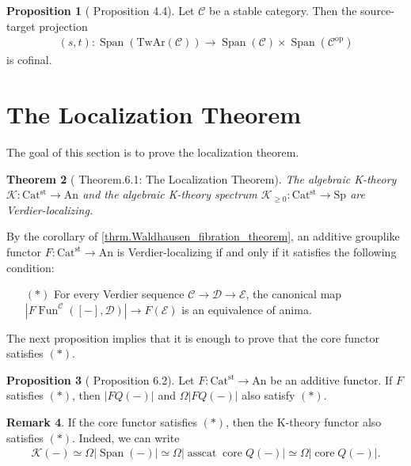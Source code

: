 \documentclass[a4paper,dvipdfmx,11pt,reqno]{amsart}
\DeclareMathOperator{\myop}{op}
\DeclareMathOperator{\Fun}{Fun}
\newcommand{\C}{\mathcal{C}}
\newcommand{\D}{\mathcal{D}}
\newcommand{\E}{\mathcal{E}}
\newcommand{\K}{\mathcal{K}}
\DeclareMathOperator{\core}{core}
\DeclareMathOperator{\asscat}{asscat}
\DeclareMathOperator{\Span}{Span}
\newcommand{\An}{\mathrm{An}}
\newcommand{\Catst}{\mathrm{Cat^{st}}}
\newcommand{\TwAr}{\mathrm{TwAr}}
\newcommand{\Sp}{\mathrm{Sp}}
\newtheorem{theorem}{Theorem}[section]
\theoremstyle{definition}
\newtheorem{proposition}[theorem]{Proposition}
\newtheorem{remark}[theorem]{Remark}
\begin{document}
\begin{proposition}[\cite{HLS23} Proposition 4.4] \label{HLS23.prop.4.4}
  Let $\C$ be a stable category.
  Then the source-target projection 
  \begin{align*}
    (s,t) : \Span(\TwAr(\C)) \to \Span(\C) \times \Span(\C^{\myop})
  \end{align*}
  is cofinal.
\end{proposition}


\section{The Localization Theorem}

The goal of this section is to prove the localization theorem.

\begin{theorem}[\cite{HLS23} Theorem.6.1: The Localization Theorem] \label{thrm.localization_theorem}
  The algebraic K-theory $\K : \Catst \to \An$ and the algebraic K-theory spectrum $\K_{\geq 0} : \Catst \to \Sp$ are Verdier-localizing.
\end{theorem}

By the corollary of \cref{thrm.Waldhausen_fibration_theorem}, an additive grouplike functor $F : \Catst \to \An$ is Verdier-localizing if and only if it satisfies the following condition:
\begin{itemize}
  \item[$(\ast)$] For every Verdier sequence $\C \to \D \to \E$, the canonical map $|F\Fun^{\C}([-],\D)| \to F(\E)$ is an equivalence of anima.
\end{itemize}

The next proposition implies that it is enough to prove that the core functor satisfies $(\ast)$.

\begin{proposition}[\cite{HLS23} Proposition 6.2] \label{HLS23.prop.6.2} 
  Let $F : \Catst \to \An$ be an additive functor.
  If $F$ satisfies $(\ast)$, then $|FQ(-)|$ and $\Omega|FQ(-)|$ also satisfy $(\ast)$.
\end{proposition}

\begin{remark}
  If the core functor satisfies $(\ast)$, then the K-theory functor also satisfies $(\ast)$.
  Indeed, we can write 
  \begin{align*}
    \K(-) 
    \simeq \Omega|\Span(-)| 
    \simeq \Omega|\asscat\core Q(-)| 
    \simeq \Omega|\core Q(-)|.
  \end{align*}
\end{remark}
\end{document}
